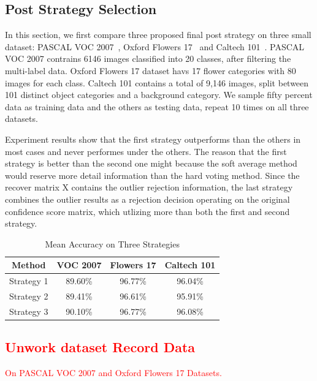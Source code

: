 \documentclass[letterpaper]{article}
\def\yanred{\textcolor{red}}
\begin{document}
\subsection{Post Strategy Selection}
In this section, we first compare three proposed final post strategy on three small dataset: PASCAL VOC 2007~\cite{pascal-voc-2007}, Oxford Flowers 17~\cite{nilsback2006visual} and Caltech 101~\cite{Li2006One}.
PASCAL VOC 2007 contrains 6146 images classified into 20 classes, after filtering the multi-label data. 
Oxford Flowers 17 dataset havs 17 flower categories with 80 images for each class. 
Caltech 101 contains a total of 9,146 images, split between 101 distinct object categories and a background category.
We sample fifty percent data as training data and the others as testing data, repeat 10 times on all three datasets.

Experiment results show that the first strategy outperforms than the others in most cases and never performes under the others. 
The reason that the first strategy is better than the second one might because the soft average method would reserve more detail information than the hard voting method.
Since the recover matrix X contains the outlier rejection information, 
the last strategy combines the outlier results as a rejection decision operating on the original confidence score matrix, which utlizing more than both the first and second strategy.

\begin{table}[h]\small
\centering
\label{table:strategy}
\begin{tabular}{c|c|c|c}
\hline
Method                       & VOC 2007 &  Flowers 17  & Caltech 101 \\\hline
Strategy 1                   & 89.60\%  &  96.77\%     &   96.04\%   \\\hline
Strategy 2                   & 89.41\%  &  96.61\%     &   95.91\%   \\\hline
Strategy 3                   & 90.10\%  &  96.77\%     &   96.08\%   \\
\hline
\end{tabular}
\caption{Mean Accuracy on Three Strategies}
\end{table}


\subsection{\yanred{Unwork dataset Record Data}}

\yanred{On PASCAL VOC 2007 and Oxford Flowers 17 Datasets.}
\end{document}
